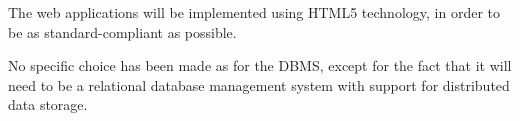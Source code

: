 The web applications will be implemented using HTML5 technology, in order to be as standard-compliant as possible.

No specific choice has been made as for the DBMS, except for the fact that it will need to be a relational database management system with support for distributed data storage.